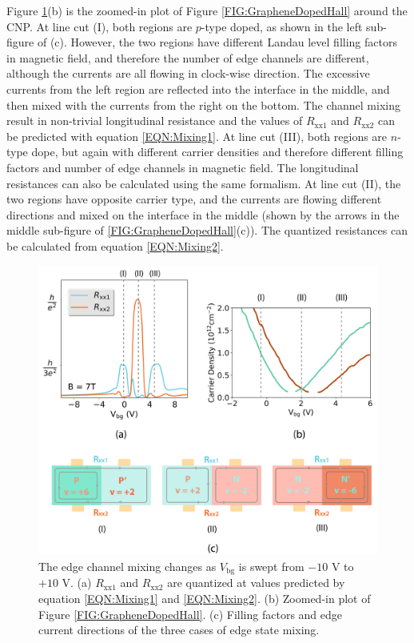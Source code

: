 \documentclass[pdflatex, sectionletters, 12pt]{pittetd}    %
\begin{document}
Figure \ref{FIG:EdgeChannels}(b) is the zoomed-in plot of Figure \ref{FIG:GrapheneDopedHall} around the CNP. At line cut (I), both regions are $p$-type doped, as shown in the left sub-figure of (c). However, the two regions have different Landau level filling factors in magnetic field, and therefore the number of edge channels are different, although the currents are all flowing in clock-wise direction. The excessive currents from the left region are reflected into the interface in the middle, and then mixed with the currents from the right on the bottom. The channel mixing result in non-trivial longitudinal resistance and the values of $R_\mathrm{xx1}$ and $R_\mathrm{xx2}$ can be predicted with equation \ref{EQN:Mixing1}. At line cut (III), both regions are $n$-type dope, but again with different carrier densities and therefore different filling factors and number of edge channels in magnetic field. The longitudinal resistances can also be calculated using the same formalism. At line cut (II), the two regions have opposite carrier type, and the currents are flowing different directions and mixed on the interface in the middle (shown by the arrows in the middle sub-figure of \ref{FIG:GrapheneDopedHall}(c)). The quantized resistances can be calculated from equation \ref{EQN:Mixing2}.


\begin{figure}[p]
	\centering
	\includegraphics[width=1.0\textwidth]{Drawing/EdgeChannels.pdf}
	\caption{The edge channel mixing changes as $V_\mathrm{bg}$ is swept from $-10$ V to $+10$ V. (a) $R_\mathrm{xx1}$ and $R_\mathrm{xx2}$ are quantized at values predicted by equation \ref{EQN:Mixing1} and \ref{EQN:Mixing2}. (b) Zoomed-in plot of Figure \ref{FIG:GrapheneDopedHall}. (c) Filling factors and edge current directions of the three cases of edge state mixing.}
	\label{FIG:EdgeChannels}
\end{figure}
\end{document}

